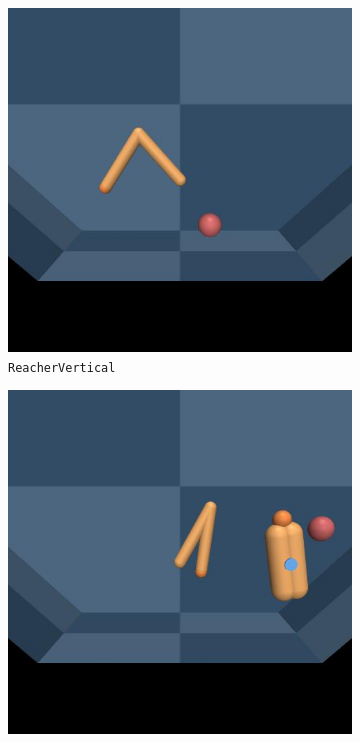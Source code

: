 \label{sec:task-renders}


\begin{figure}[h]
\centering
\begin{subfigure}[t]{0.3\textwidth}
    \includegraphics[width=\textwidth]{figures/dyne/ReacherVertical.jpg}
    \caption{\texttt{ReacherVertical}}
\end{subfigure}
\begin{subfigure}[t]{0.3\textwidth}
    \includegraphics[width=\textwidth]{figures/dyne/ReacherTurn.jpg}

\end{subfigure}
\end{figure}
